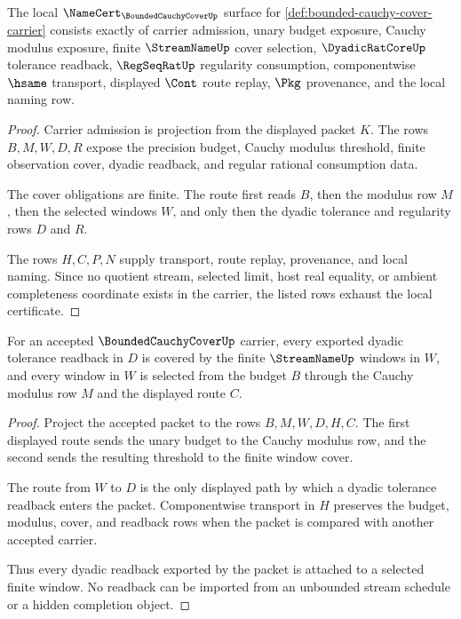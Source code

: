 \begin{theorem}
\label{thm:bounded-cauchy-cover-namecert-obligations}
The local $\NameCert_{\BoundedCauchyCoverUp}$ surface for \autoref{def:bounded-cauchy-cover-carrier} consists exactly of carrier admission, unary budget exposure, Cauchy modulus exposure, finite $\StreamNameUp$ cover selection, $\DyadicRatCoreUp$ tolerance readback, $\RegSeqRatUp$ regularity consumption, componentwise $\hsame$ transport, displayed $\Cont$ route replay, $\Pkg$ provenance, and the local naming row.
\end{theorem}
\begin{proof}
Carrier admission is projection from the displayed packet $K$. The rows $B,M,W,D,R$ expose the precision budget, Cauchy modulus threshold, finite observation cover, dyadic readback, and regular rational consumption data.

The cover obligations are finite. The route first reads $B$, then the modulus row $M$, then the selected windows $W$, and only then the dyadic tolerance and regularity rows $D$ and $R$.

The rows $H,C,P,N$ supply transport, route replay, provenance, and local naming. Since no quotient stream, selected limit, host real equality, or ambient completeness coordinate exists in the carrier, the listed rows exhaust the local certificate.
\end{proof}

\begin{theorem}
\label{thm:bounded-cauchy-cover-finite-window-coverage}
For an accepted $\BoundedCauchyCoverUp$ carrier, every exported dyadic tolerance readback in $D$ is covered by the finite $\StreamNameUp$ windows in $W$, and every window in $W$ is selected from the budget $B$ through the Cauchy modulus row $M$ and the displayed route $C$.
\end{theorem}
\begin{proof}
Project the accepted packet to the rows $B,M,W,D,H,C$. The first displayed route sends the unary budget to the Cauchy modulus row, and the second sends the resulting threshold to the finite window cover.

The route from $W$ to $D$ is the only displayed path by which a dyadic tolerance readback enters the packet. Componentwise transport in $H$ preserves the budget, modulus, cover, and readback rows when the packet is compared with another accepted carrier.

Thus every dyadic readback exported by the packet is attached to a selected finite window. No readback can be imported from an unbounded stream schedule or a hidden completion object.
\end{proof}

